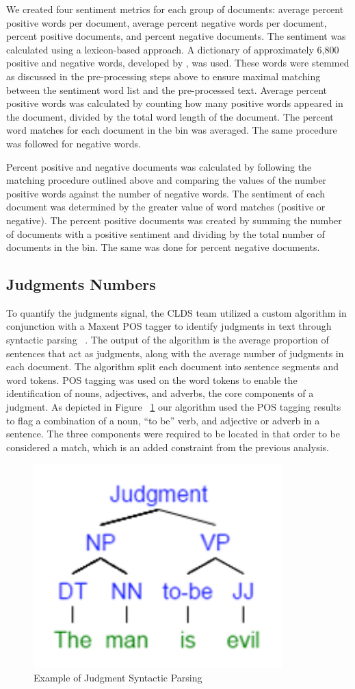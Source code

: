 \documentclass[11pt]{article}
\begin{document}
We created four sentiment metrics for each group of documents: average percent positive words per document, average percent negative words per document, percent positive documents, and percent negative documents. The sentiment was calculated using a lexicon-based approach. A dictionary of approximately 6,800 positive and negative words, developed by , was used. These words were stemmed as discussed in the pre-processing steps above to ensure maximal matching between the sentiment word list and the pre-processed text. Average percent positive words was calculated by counting how many positive words appeared in the document, divided by the total word length of the document. The percent word matches for each document in the bin was averaged. The same procedure was followed for negative words. 

Percent positive and negative documents was calculated by following the matching procedure outlined above and comparing the values of the number positive words against the number of negative words. The sentiment of each document was determined by the greater value of word matches (positive or negative). The percent positive documents was created by summing the number of documents with a positive sentiment and dividing by the total number of documents in the bin. The same was done for percent negative documents.

\subsection{Judgments Numbers}

To quantify the judgments signal, the CLDS team utilized a custom algorithm in conjunction with a Maxent POS tagger to identify judgments in text through syntactic parsing ~\cite{Hornik2011}. The output of the algorithm is the average proportion of sentences that act as judgments, along with the average number of judgments in each document. The algorithm split each document into sentence segments and word tokens. POS tagging was used on the word tokens to enable the identification of nouns, adjectives, and adverbs, the core components of a judgment. As depicted in Figure ~\ref{fig:judgment} our algorithm used the POS tagging results to flag a combination of a noun, “to be” verb, and adjective or adverb in a sentence. The three components were required to be located in that order to be considered a match, which is an added constraint from the previous analysis.  

\begin{figure}[h]
\begin{center}
\includegraphics[width = .25\textwidth]{figs/judgment}
\caption{Example of Judgment Syntactic Parsing}
\label{fig:judgment}
\end{center}
\end{figure}
\end{document}
